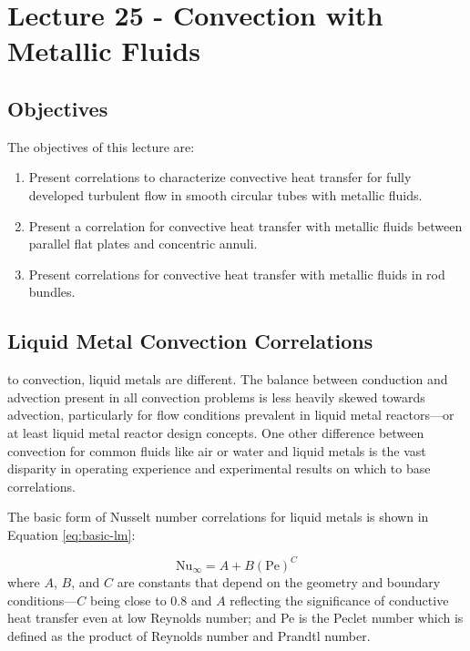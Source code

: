 \chapter{Lecture 25 - Convection with Metallic Fluids}
\label{ch:ch25}
\section{Objectives}
The objectives of this lecture are:
\begin{enumerate}
\item Present correlations to characterize convective heat transfer for fully developed turbulent flow in smooth circular tubes with metallic fluids.
\item Present a correlation for convective heat transfer with metallic fluids between parallel flat plates and concentric annuli.
\item Present correlations for convective heat transfer with metallic fluids in rod bundles.
\end{enumerate}

\section{Liquid Metal Convection Correlations}
 to convection, liquid metals are different.  The balance between conduction and advection present in all convection problems is less heavily skewed towards advection, particularly for flow conditions prevalent in liquid metal reactors---or at least liquid metal reactor design concepts.  One other difference between convection for common fluids like air or water and liquid metals is the vast disparity in operating experience and experimental results on which to base correlations.  

The basic form of Nusselt number correlations for liquid metals is shown in Equation \ref{eq:basic-lm}:

\begin{equation}
\text{Nu}_{\infty} = A + B\left(\text{Pe}\right)^{C}
\label{eq:basic-lm}
\end{equation}
where $A$, $B$, and $C$ are constants that depend on the geometry  and boundary conditions---$C$ being close to 0.8 and $A$ reflecting the significance of conductive heat transfer even at low Reynolds number; and Pe is the Peclet number which is defined as the product of Reynolds number and Prandtl number. 


